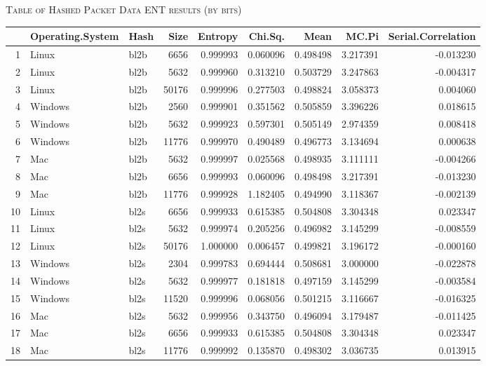 \documentclass{IEEEtran}
\begin{document}
\begin{center}
\textsc{Table of Hashed Packet Data ENT results (by bits)}
\end{center}
\begin{longtable}{rllrrrrrr}
  \hline
 & Operating.System & Hash & Size & Entropy & Chi.Sq. & Mean & MC.Pi & Serial.Correlation \\ 
  \hline
1 & Linux & bl2b &    6656 & 0.999993 & 0.060096 & 0.498498 & 3.217391 & -0.013230 \\ 
  2 & Linux & bl2b &    5632 & 0.999960 & 0.313210 & 0.503729 & 3.247863 & -0.004317 \\ 
  3 & Linux & bl2b &   50176 & 0.999996 & 0.277503 & 0.498824 & 3.058373 & 0.004060 \\ 
  4 & Windows & bl2b &    2560 & 0.999901 & 0.351562 & 0.505859 & 3.396226 & 0.018615 \\ 
  5 & Windows & bl2b &    5632 & 0.999923 & 0.597301 & 0.505149 & 2.974359 & 0.008418 \\ 
  6 & Windows & bl2b &   11776 & 0.999970 & 0.490489 & 0.496773 & 3.134694 & 0.000638 \\ 
  7 & Mac & bl2b &    5632 & 0.999997 & 0.025568 & 0.498935 & 3.111111 & -0.004266 \\ 
  8 & Mac & bl2b &    6656 & 0.999993 & 0.060096 & 0.498498 & 3.217391 & -0.013230 \\ 
  9 & Mac & bl2b &   11776 & 0.999928 & 1.182405 & 0.494990 & 3.118367 & -0.002139 \\ 
  10 & Linux & bl2s &    6656 & 0.999933 & 0.615385 & 0.504808 & 3.304348 & 0.023347 \\ 
  11 & Linux & bl2s &    5632 & 0.999974 & 0.205256 & 0.496982 & 3.145299 & -0.008559 \\ 
  12 & Linux & bl2s &   50176 & 1.000000 & 0.006457 & 0.499821 & 3.196172 & -0.000160 \\ 
  13 & Windows & bl2s &    2304 & 0.999783 & 0.694444 & 0.508681 & 3.000000 & -0.022878 \\ 
  14 & Windows & bl2s &    5632 & 0.999977 & 0.181818 & 0.497159 & 3.145299 & -0.003584 \\ 
  15 & Windows & bl2s &   11520 & 0.999996 & 0.068056 & 0.501215 & 3.116667 & -0.016325 \\ 
  16 & Mac & bl2s &    5632 & 0.999956 & 0.343750 & 0.496094 & 3.179487 & -0.011425 \\ 
  17 & Mac & bl2s &    6656 & 0.999933 & 0.615385 & 0.504808 & 3.304348 & 0.023347 \\ 
  18 & Mac & bl2s &   11776 & 0.999992 & 0.135870 & 0.498302 & 3.036735 & 0.013915 \\ 

\end{longtable}
\end{document}
